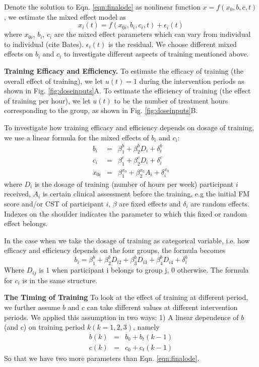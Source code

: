 {	Denote the solution to Eqn. \ref{eqn:finalode} as nonlinear function $ x=f(x_0,b,c,t) $, we estimate the mixed effect model as
	\begin{equation}
	x_i (t)=f(x_{0i},b_i,c_i,t) + \epsilon_i (t)
	\end{equation}
	where $ x_{0i} $, $ b_i $, $ c_i $ are the mixed effect parameters which can vary from individual to individual (cite Bates).
	$ \epsilon_i (t) $ is the residual. 
	We choose different mixed effects on $ b_i $ and $ c_i $ to investigate different aspects of training mentioned above.
	
	\textbf{Training Efficacy and Efficiency.}
	To estimate the efficacy of training (the overall effect of training), we let $ u(t)=1 $ during the intervention periods as shown in Fig. \ref{fig:doseinputs}A. 
	To estimate the efficiency of training (the effect of training per hour), we let $ u(t) $ to be the number of treatment hours corresponding to the group, as shown in Fig. \ref{fig:doseinputs}B. 
	
	To investigate how training efficacy and efficiency depends on dosage of training, we use a linear formula for the mixed effects of $ b_i $ and $ c_i $:
	\begin{eqnarray}\label{eqn:mixedeffectinSM}
	b_i &=& \beta_1^b + \beta_2^b D_i + \delta_i^b   \nonumber \\
	c_i &=& \beta_1^c + \beta_2^c D_i + \delta_i^c   \\
	x_{0i} &=& \beta_1^{x_0} + \beta_2^{x_0} A_i + \delta_i^{x_0} \nonumber
	\end{eqnarray}
	where $ D_i $ is the dosage of training (number of hours per week) participant $ i $ received, 
	$ A_i $ is certain clinical assessment before the training, e.g the initial FM score and/or CST of participant $ i $, 
	$ \beta $ are fixed effects and $ \delta_i $ are random effects. 
	Indexes on the shoulder indicates the parameter to which this fixed or random effect belongs.
	
	In the case when we take the dosage of training as categorical variable, i.e. how efficacy and efficiency depends on the four groups, the formula becomes
	\begin{equation}
	b_i = \beta_1^b + \beta_2^b D_{i2} + \beta_3^b D_{i3} + \beta_4^b D_{i4} + \delta_i^b
	\end{equation}
	Where $ D_{ij} $ is 1 when participant i belongs to group j, 0 otherwise. The formula for $ c_i $ is in the same structure.
	
	\textbf{The Timing of Training}
	To look at the effect of training at different period, we further assume $ b $ and $ c $ can take different values at different intervention periods. 
	We applied this assumption in two ways: 1) A linear dependence of $ b $ (and $ c $) on training period $ k (k=1,2,3) $, namely
	\begin{eqnarray}\label{eqn:timingcat2}
	b(k) &=& b_0 + b_t (k-1) \nonumber  \\
	c(k) &=& c_0 + c_t (k-1)
	\end{eqnarray}
	So that we have two more parameters than Eqn. \ref{eqn:finalode}. 
	
}
